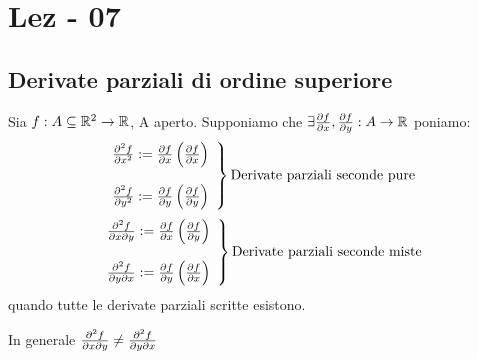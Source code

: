 \section{Lez - 07}
\subsection{Derivate parziali di ordine superiore}
Sia $f: A \subseteq \mathbb{R}^2 \to \mathbb{R}$, A aperto. Supponiamo che $\exists \frac{\partial f}{\partial x}, \frac{\partial f}{\partial y}: A \to \mathbb{R}$
poniamo:
$$\left.\begin{array}{l}
  \frac{\partial^2 f}{\partial x^2} := \frac{\partial f}{\partial x} \left(\frac{\partial f}{\partial x}\right) \\
  \\
  \frac{\partial^2 f}{\partial y^2} := \frac{\partial f}{\partial y} \left(\frac{\partial f}{\partial y}\right) \\
\end{array}\right\} \text{Derivate parziali seconde pure}$$
$$\left.\begin{array}{l}
  \frac{\partial^2 f}{\partial x \partial y} := \frac{\partial f}{\partial x} \left(\frac{\partial f}{\partial y}\right) \\
  \\
  \frac{\partial^2 f}{\partial y \partial x} := \frac{\partial f}{\partial y} \left(\frac{\partial f}{\partial x}\right) \\
\end{array}\right\} \text{Derivate parziali seconde miste}$$
quando tutte le derivate parziali scritte esistono.
\begin{osservazione}
  In generale $\frac{\partial^2 f}{\partial x \partial y} \neq \frac{\partial^2 f}{\partial y \partial x}$
\end{osservazione}
